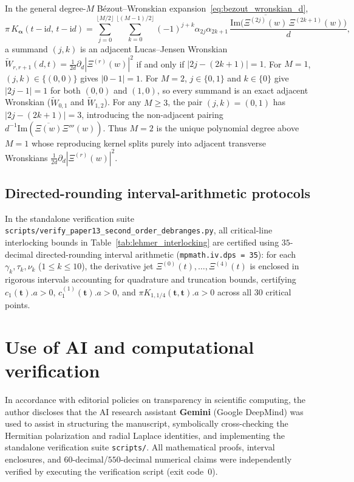 \documentclass[11pt,reqno]{amsart}
\theoremstyle{definition}
\theoremstyle{remark}
\numberwithin{equation}{section}
\newcommand{\ii}{\mathrm{i}}
\newcommand{\Ima}{\mathrm{Im}}
\begin{document}
In the general degree-$M$ Bézout--Wronskian expansion~\eqref{eq:bezout_wronskian_d},
\[
\pi\,K_{\boldsymbol{\alpha}}(t - \ii d,\, t - \ii d) = \sum_{j=0}^{\lfloor M/2\rfloor} \sum_{k=0}^{\lfloor(M-1)/2\rfloor} (-1)^{j+k}\alpha_{2j}\alpha_{2k+1}\,\frac{\Ima\bigl(\overline{\Xi^{(2j)}(w)}\,\Xi^{(2k+1)}(w)\bigr)}{d},
\]
a summand $(j,k)$ is an adjacent Lucas--Jensen Wronskian $\widetilde{W}_{r,r+1}(d,t) = \frac{1}{2d}\partial_d|\Xi^{(r)}(w)|^2$ if and only if $|2j - (2k+1)| = 1$. For $M = 1$, $(j,k) \in \{(0,0)\}$ gives $|0 - 1| = 1$. For $M = 2$, $j \in \{0, 1\}$ and $k \in \{0\}$ give $|2j - 1| = 1$ for both $(0,0)$ and $(1,0)$, so every summand is an exact adjacent Wronskian ($\widetilde{W}_{0,1}$ and $\widetilde{W}_{1,2}$). For any $M \ge 3$, the pair $(j,k) = (0, 1)$ has $|2j - (2k+1)| = 3$, introducing the non-adjacent pairing $d^{-1}\Ima(\overline{\Xi(w)}\Xi'''(w))$. Thus $M = 2$ is the unique polynomial degree above $M = 1$ whose reproducing kernel splits purely into adjacent transverse Wronskians $\frac{1}{2d}\partial_d|\Xi^{(r)}(w)|^2$.

\subsection{Directed-rounding interval-arithmetic protocols}\label{app:interval}

In the standalone verification suite \texttt{scripts/}\allowbreak\texttt{verify\_paper13\_}\allowbreak\texttt{second\_order\_}\allowbreak\texttt{debranges.py}, all critical-line interlocking bounds in Table~\ref{tab:lehmer_interlocking} are certified using $35$-decimal directed-rounding interval arithmetic (\texttt{mpmath.iv.dps = 35}): for each $\gamma_k, \tau_k, \nu_k$ ($1 \le k \le 10$), the derivative jet $\Xi^{(0)}(t), \dots, \Xi^{(4)}(t)$ is enclosed in rigorous intervals accounting for quadrature and truncation bounds, certifying $c_1(\boldsymbol{t}).a > 0$, $c_1^{(1)}(\boldsymbol{t}).a > 0$, and $\pi K_{1,1/4}(\boldsymbol{t}, \boldsymbol{t}).a > 0$ across all $30$ critical points.

\section*{Use of AI and computational verification}

{\sloppy
In accordance with editorial policies on transparency in scientific computing, the author discloses that the AI research assistant \textbf{Gemini} (Google DeepMind) was used to assist in structuring the manuscript, symbolically cross-checking the Hermitian polarization and radial Laplace identities, and implementing the standalone verification suite \texttt{scripts/}\allowbreak\texttt{}. All mathematical proofs, interval enclosures, and $60$-decimal/$550$-decimal numerical claims were independently verified by executing the verification script (exit code~$0$).\par}
\end{document}
